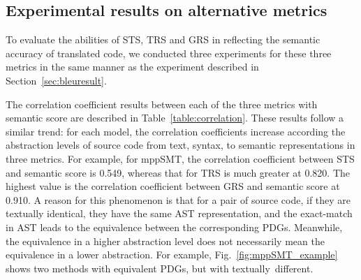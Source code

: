 \subsection{Experimental results on alternative metrics}


To evaluate the abilities of STS, TRS and GRS in reflecting the
semantic accuracy of translated code, we conducted three experiments
for these three metrics in the same manner as the experiment described in
Section~\ref{sec:bleuresult}.

The correlation coefficient results between each of the three metrics
with semantic score are described in
Table~\ref{table:correlation}. These results follow a similar trend:
for each model, the correlation coefficients increase 
according the abstraction levels of source code from text, syntax, to semantic
representations in three metrics. For example, for mppSMT, the correlation
coefficient between STS and semantic score is 0.549, whereas that
for TRS is much greater at 0.820. The highest value is the
correlation coefficient between GRS and semantic score at 0.910. A
reason for this phenomenon is that for a pair of source code, if they
are textually identical, they have the same AST representation, and
the exact-match in AST leads to the equivalence between the
corresponding PDGs. Meanwhile, the equivalence in a higher
abstraction level does not necessarily mean the equivalence in a
lower abstraction. For example, Fig.~\ref{fig:mppSMT_example} shows
two methods with equivalent PDGs, but with textually~different. 


